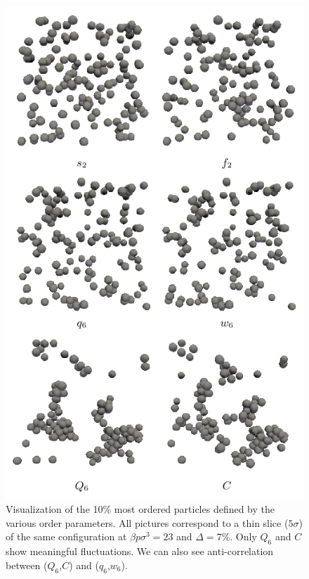 \documentclass[twocolumn,superscriptaddress]{revtex4}
\begin{document}
\begin{figure}
	\centering
	\includegraphics{fig_3D}
	\caption{Visualization of the 10\% most ordered particles defined by the various order parameters. All pictures correspond to a thin slice ($5\sigma$) of the same configuration at $\beta p\sigma^3=23$ and $\Delta=7\%$. Only $Q_6$ and $C$ show meaningful fluctuations. We can also see anti-correlation between ($Q_6$,$C$) and ($q_6$,$w_6$). }
	\label{fig:3D}
\end{figure}
\end{document}
